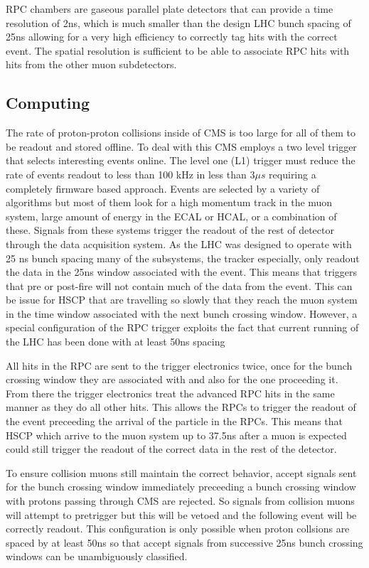 RPC chambers are gaseous parallel plate detectors that can provide a time resolution of 2ns, which is much smaller than the design LHC bunch spacing of 25ns allowing for
a very high efficiency to correctly tag hits with the correct event. The spatial resolution is sufficient to be able to associate RPC hits with hits
from the other muon subdetectors.

\subsection{Computing \label{sec:computing}}
The rate of proton-proton collisions inside of CMS is too large for all of them to be readout and stored offline. To deal with this CMS employs a two level trigger
that selects interesting events online. The level one (L1) trigger must reduce the rate of events readout to less than 100 kHz in less than 3$\mu s$
requiring a completely firmware based approach. Events are selected by a variety of algorithms but most of them look for a high momentum track in the muon
system, large amount of energy in the ECAL or HCAL, or a combination of these. Signals from these systems trigger the readout of the rest of detector through
the data acquisition system. As the LHC was designed to operate with 25 ns bunch spacing many of the subsystems, the tracker especially, only readout
the data in the 25ns window associated with the event. This means that triggers that pre or post-fire will not contain much of the data from the event.
This can be issue for HSCP that are travelling so slowly that they reach the muon system in the time window associated with the next bunch crossing window.
However, a special configuration of the RPC trigger exploits the fact that current running of the LHC has been done with at least 50ns spacing

All hits in the RPC are sent to the trigger electronics twice, once for the bunch crossing window they are associated with and also for the one proceeding it.
From there the trigger electronics treat the advanced RPC hits in the same manner as they do all other hits. 
This allows the RPCs to trigger the readout of the event preceeding the arrival of the particle in the RPCs.
This means that HSCP which arrive to the muon system up to 37.5ns after
a muon is expected could still trigger the readout of the correct data in the rest of the detector.

To ensure collision muons still maintain the correct behavior, accept signals sent for the bunch crossing window immediately
preceeding a bunch crossing window with protons passing through CMS are rejected. 
So signals from collision muons will attempt to pretrigger but this will be vetoed and the following event will be correctly readout.
This configuration is only possible  when proton collsions are spaced by at least 50ns so that accept signals from successive 25ns
bunch crossing windows can be unambiguously classified.

